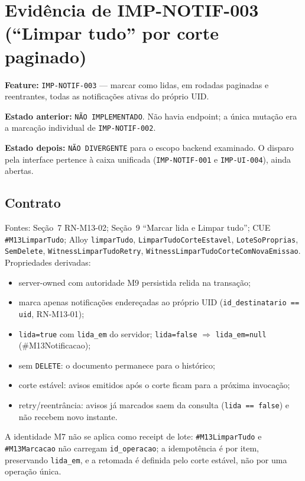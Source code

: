 \section{Evidência de IMP-NOTIF-003 (``Limpar tudo'' por corte paginado)}

\textbf{Feature:} \texttt{IMP-NOTIF-003} --- marcar como lidas, em rodadas
paginadas e reentrantes, todas as notificações ativas do próprio UID.

\textbf{Estado anterior:} \texttt{NÃO IMPLEMENTADO}. Não havia endpoint; a única
mutação era a marcação individual de \texttt{IMP-NOTIF-002}.

\textbf{Estado depois:} \texttt{NÃO DIVERGENTE} para o escopo backend examinado.
O disparo pela interface pertence à caixa unificada (\texttt{IMP-NOTIF-001} e
\texttt{IMP-UI-004}), ainda abertas.

\subsection{Contrato}

Fontes: Seção~7 RN-M13-02; Seção~9 ``Marcar lida e Limpar tudo''; CUE
\texttt{\#M13LimparTudo}; Alloy \texttt{limparTudo},
\texttt{LimparTudoCorteEstavel}, \texttt{LoteSoProprias}, \texttt{SemDelete},
\texttt{WitnessLimparTudoRetry}, \texttt{WitnessLimparTudoCorteComNovaEmissao}.
Propriedades derivadas:

\begin{itemize}
  \item server-owned com autoridade M9 persistida relida na transação;
  \item marca apenas notificações endereçadas ao próprio UID
        (\texttt{id\_destinatario == uid}, RN-M13-01);
  \item \texttt{lida=true} com \texttt{lida\_em} do servidor; \texttt{lida=false}
        $\Rightarrow$ \texttt{lida\_em=null} (\#M13Notificacao);
  \item sem \texttt{DELETE}: o documento permanece para o histórico;
  \item corte estável: avisos emitidos após o corte ficam para a próxima
        invocação;
  \item retry/reentrância: avisos já marcados saem da consulta
        (\texttt{lida == false}) e não recebem novo instante.
\end{itemize}

A identidade M7 não se aplica como receipt de lote: \texttt{\#M13LimparTudo} e
\texttt{\#M13Marcacao} não carregam \texttt{id\_operacao}; a idempotência é
por item, preservando \texttt{lida\_em}, e a retomada é definida pelo corte
estável, não por uma operação única.

